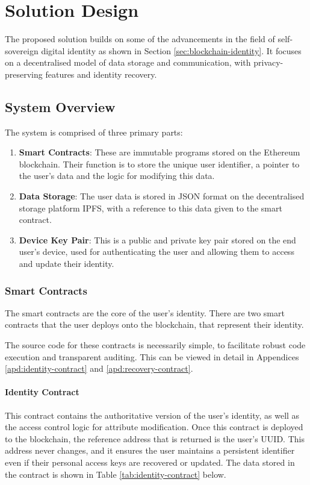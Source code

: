 \chapter{Solution Design}
\label{chp:solution-design}
The proposed solution builds on some of the advancements in the field of self-sovereign digital identity as shown in Section \ref{sec:blockchain-identity}. It focuses on a decentralised model of data storage and communication, with privacy-preserving features and identity recovery.

\section{System Overview}

The system is comprised of three primary parts:
\begin{enumerate}
	\item \textbf{Smart Contracts}: These are immutable programs stored on the Ethereum blockchain. Their function is to store the unique user identifier, a pointer to the user's data and the logic for modifying this data.
    \item \textbf{Data Storage}: The user data is stored in \ac{JSON} format on the decentralised storage platform \ac{IPFS}, with a reference to this data given to the smart contract.
	\item \textbf{Device Key Pair}: This is a public and private key pair stored on the end user's device, used for authenticating the user and allowing them to access and update their identity.
\end{enumerate}

\subsection{Smart Contracts}
The smart contracts are the core of the user's identity. There are two smart contracts that the user deploys onto the blockchain, that represent their identity.

The source code for these contracts is necessarily simple, to facilitate robust code execution and transparent auditing. This can be viewed in detail in Appendices \ref{apd:identity-contract} and \ref{apd:recovery-contract}.

\subsubsection{Identity Contract}
This contract contains the authoritative version of the user's identity, as well as the access control logic for attribute modification. Once this contract is deployed to the blockchain, the reference address that is returned is the user's \ac{UUID}. This address never changes, and it ensures the user maintains a persistent identifier even if their personal access keys are recovered or updated.
The data stored in the contract is shown in Table \ref{tab:identity-contract} below.


